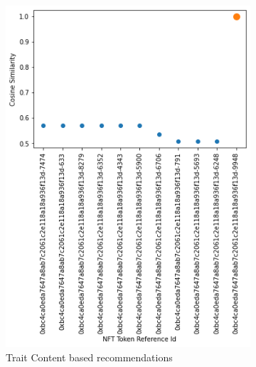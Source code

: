 \begin{figure}[h!]
     \centering
     \begin{subfigure}[b]{0.45\textwidth}
         \centering
         \includegraphics[width=\textwidth]{images/Testing/trait/Cosine Similarities of Recommended NFTs - Trait Content Based Recomendations Model.png}
         \caption{Trait Content based recommendations}
         \label{fig:trait-content-output}
     \end{subfigure}
     \hfill
     \begin{subfigure}[b]{0.45\textwidth}
         \centering

\end{subfigure}
\end{figure}
